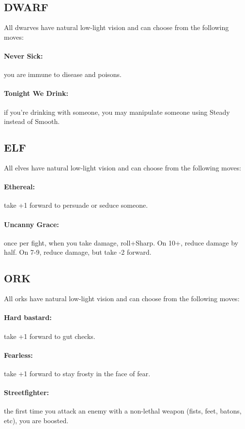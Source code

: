 \subsection{DWARF}
All dwarves have natural low-light vision and can choose from the following moves:
\paragraph{Never Sick:} you are immune to disease and poisons.
\paragraph{Tonight We Drink:} if you’re drinking with someone, you may manipulate someone using Steady instead of Smooth.

\subsection{ELF}
All elves have natural low-light vision and can choose from the following moves:
\paragraph{Ethereal:} take +1 forward to persuade or seduce someone.
\paragraph{Uncanny Grace:} once per fight, when you take damage, roll+Sharp. On 10+, reduce damage by half. On 7-9, reduce damage, but take -2 forward.

\subsection{ORK}
All orks have natural low-light vision and can choose from the following moves:

\paragraph{Hard bastard:} take +1 forward to gut checks.
\paragraph{Fearless:} take +1 forward to stay frosty in the face of fear.
\paragraph{Streetfighter:} the first time you attack an enemy with a non-lethal weapon (fists, feet, batons, etc), you are boosted.

